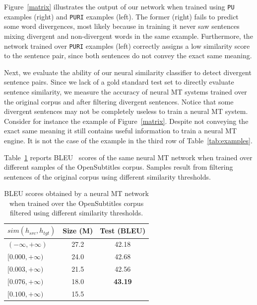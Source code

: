 \documentclass[11pt,a4paper]{article}
\begin{document}
Figure~\ref{matrix} illustrates the output of our network when trained using \texttt{PU} examples (right) and \texttt{PURI} examples (left).  
The former (right) fails to predict some word divergences, most likely because in training it never saw sentences mixing divergent and non-divergent words in the same example. 
Furthermore, the network trained over \texttt{PURI} examples (left) correctly assigns a low similarity score to the sentence pair, since both sentences do not convey the exact same meaning.

Next, we evaluate the ability of our neural similarity classifier to detect divergent sentence pairs. 
Since we lack of a gold standard test set to directly evaluate sentence similarity, 
we measure the accuracy of neural MT systems trained over the original corpus and after filtering divergent sentences. 
Notice that some divergent sentences may not be completely useless to train a neural MT system. 
Consider for instance the example of Figure~\ref{matrix}. 
Despite not conveying the exact same meaning it still contains useful information to train a neural MT engine. 
It is not the case of the example in the third row of Table~\ref{tab:examples}.

Table~\ref{results_wemb} reports BLEU~\cite{P02-1040} scores of the same neural MT network when trained over different samples of the OpenSubtitles corpus.
Samples result from filtering sentences of the original corpus using different similarity thresholds.

\begin{table}[h]
\small
\center
\begin{tabular}{lcc}
\hline
\bf $sim(h_{src},h_{tgt})$ & \bf Size (M) & \bf Test (BLEU)\\%
\hline
$(-\infty,+\infty)$   & 27.2 & 42.18 \\ %
$[0.000,+\infty)$   & 24.0 & 42.68 \\ %
$[0.003,+\infty)$   & 21.5 & 42.56 \\ %
$[0.076,+\infty)$   & 18.0 & \bf 43.19 \\ %
$[0.100,+\infty)$   & 15.5 & \\%
\hline
\end{tabular}
\caption{BLEU scores obtained by a neural MT network when trained over the OpenSubtitles corpus filtered using different similarity thresholds.}
\label{results_wemb}
\end{table}
\end{document}
